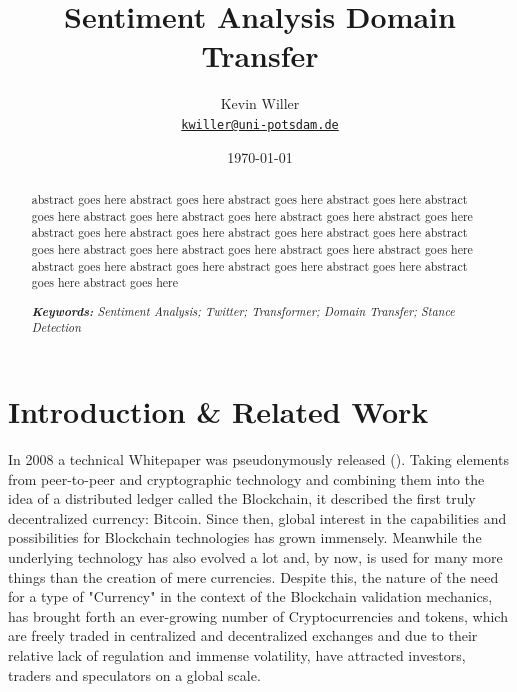 \documentclass[11pt]{article}
\title{Sentiment Analysis Domain Transfer}
\author{Kevin Willer\\%
    \href{mailto:kwiller@uni-potsdam.de}{\texttt{kwiller@uni-potsdam.de}} %
    }
\date{\today}
\begin{document}
{
\maketitle
\begin{abstract}

  abstract goes here abstract goes here abstract goes here abstract goes here abstract goes here abstract goes here abstract goes here abstract goes here abstract goes here abstract goes here abstract goes here abstract goes here abstract goes here abstract goes here abstract goes here abstract goes here abstract goes here abstract goes here abstract goes here abstract goes here abstract goes here abstract goes here abstract goes here abstract goes here

\noindent
\textit{\textbf{Keywords: }%
Sentiment Analysis; Twitter; Transformer; Domain Transfer; Stance Detection} \\ %
\noindent

\end{abstract}
}
\clearpage
\tableofcontents
\clearpage
\section{Introduction \& Related Work}
In 2008 a technical Whitepaper was pseudonymously released (\citet{bitcoin}). Taking elements from peer-to-peer and cryptographic technology and combining them into the idea of a distributed ledger called the Blockchain, it described the first truly decentralized currency: Bitcoin. Since then, global interest in the capabilities and possibilities for Blockchain technologies has grown immensely. Meanwhile the underlying technology has also evolved a lot and, by now, is used for many more things than the creation of mere currencies. Despite this, the nature of the need for a type of "Currency" in the context of the Blockchain validation mechanics, has brought forth an ever-growing number of Cryptocurrencies and tokens, which are freely traded in centralized and decentralized exchanges and due to their relative lack of regulation and immense volatility, have attracted investors, traders and speculators on a global scale. \\
\end{document}
